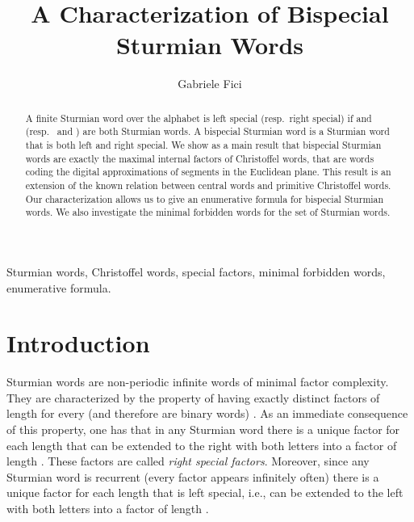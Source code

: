 \documentclass{llncs}
\begin{document}
\title{A Characterization of Bispecial \\ Sturmian Words}


\author{Gabriele Fici}



\maketitle

\begin{abstract}
A finite Sturmian word  over the alphabet  is left special (resp.~right special)  if  and  (resp.~ and ) are both Sturmian words. A bispecial Sturmian word is a Sturmian word that is both left and right special. We show as a main result that bispecial Sturmian words are exactly the maximal internal factors of Christoffel words, that are words coding the digital approximations of segments in the Euclidean plane. This result is an extension of the known relation between central words and primitive Christoffel words. Our characterization allows us to give an enumerative formula for bispecial Sturmian words. We also investigate the minimal forbidden words for the set of Sturmian words.
\end{abstract}

\keywords Sturmian words, Christoffel words, special factors, minimal forbidden words, enumerative formula.


\section{Introduction}\label{sec:intro}


Sturmian words are non-periodic infinite words of minimal factor complexity. They are characterized by the property of having exactly  distinct factors of length  for every  (and therefore are binary words) \cite{MoHe40}. As an immediate consequence of this property, one has that in any Sturmian word there is a unique factor for each length  that can be extended to the right with both letters into a factor of length . These factors are called \emph{right special factors}. Moreover, since any Sturmian word is recurrent (every factor appears infinitely often) there is a unique factor for each length  that is left special, i.e., can be extended to the left with both letters into a factor of length .
\end{document}
